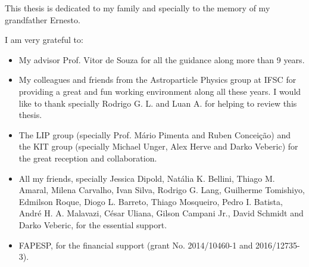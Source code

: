 \begin{agradecimentos}
  This thesis is dedicated to my family and specially to the memory of my grandfather Ernesto.

  I am very grateful to:
  \begin{itemize}
  \item My advisor Prof. Vitor de Souza for all the guidance along more than 9 years.
  \item My colleagues and friends from the Astroparticle Physics group at IFSC for providing a great and fun working environment along all these years. I would like to thank specially Rodrigo G. L. and Luan A. for helping to review this thesis.  
  \item The LIP group (specially Prof. Mário Pimenta and Ruben Conceição) and the KIT group (specially Michael Unger, Alex Herve and Darko Veberic) for the great reception and collaboration. 
  \item All my friends, specially Jessica Dipold, Natália K. Bellini, Thiago M. Amaral, Milena Carvalho, Ivan Silva, Rodrigo G. Lang, Guilherme Tomishiyo, Edmilson Roque, Diogo L. Barreto, Thiago Mosqueiro, Pedro I. Batista, André H. A. Malavazi, César Uliana, Gilson Campani Jr., David Schmidt and Darko Veberic, for the essential support.   
  \item FAPESP, for the financial support (grant No. 2014/10460-1 and 2016/12735-3).
  \end{itemize}

\end{agradecimentos}
